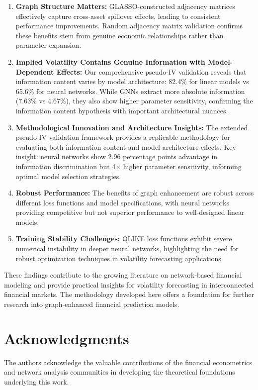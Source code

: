 \documentclass[12pt,a4paper]{article}
\begin{document}
\begin{enumerate}
\item \textbf{Graph Structure Matters:} GLASSO-constructed adjacency matrices effectively capture cross-asset spillover effects, leading to consistent performance improvements. Random adjacency matrix validation confirms these benefits stem from genuine economic relationships rather than parameter expansion.

\item \textbf{Implied Volatility Contains Genuine Information with Model-Dependent Effects:} Our comprehensive pseudo-IV validation reveals that information content varies by model architecture: 82.4\% for linear models vs 65.6\% for neural networks. While GNNs extract more absolute information (7.63\% vs 4.67\%), they also show higher parameter sensitivity, confirming the information content hypothesis with important architectural nuances.

\item \textbf{Methodological Innovation and Architecture Insights:} The extended pseudo-IV validation framework provides a replicable methodology for evaluating both information content and model architecture effects. Key insight: neural networks show 2.96 percentage points advantage in information discrimination but 4× higher parameter sensitivity, informing optimal model selection strategies.

\item \textbf{Robust Performance:} The benefits of graph enhancement are robust across different loss functions and model specifications, with neural networks providing competitive but not superior performance to well-designed linear models.

\item \textbf{Training Stability Challenges:} QLIKE loss functions exhibit severe numerical instability in deeper neural networks, highlighting the need for robust optimization techniques in volatility forecasting applications.
\end{enumerate}

These findings contribute to the growing literature on network-based financial modeling and provide practical insights for volatility forecasting in interconnected financial markets. The methodology developed here offers a foundation for further research into graph-enhanced financial prediction models.

\section*{Acknowledgments}

The authors acknowledge the valuable contributions of the financial econometrics and network analysis communities in developing the theoretical foundations underlying this work.



\end{document}
